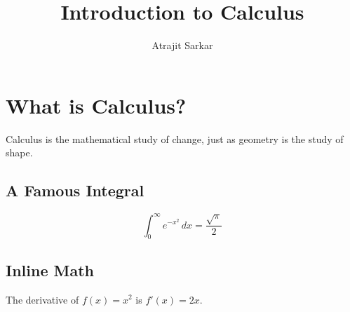 \documentclass{article}
\title{Introduction to Calculus}
\author{Atrajit Sarkar}
\date{}
\begin{document}
\maketitle

\section*{What is Calculus?}
Calculus is the mathematical study of change, just as geometry is the study of shape.

\subsection*{A Famous Integral}
\[
\int_{0}^{\infty} e^{-x^2} \, dx = \frac{\sqrt{\pi}}{2}
\]

\subsection*{Inline Math}
The derivative of $f(x) = x^2$ is $f'(x) = 2x$.
\end{document}
